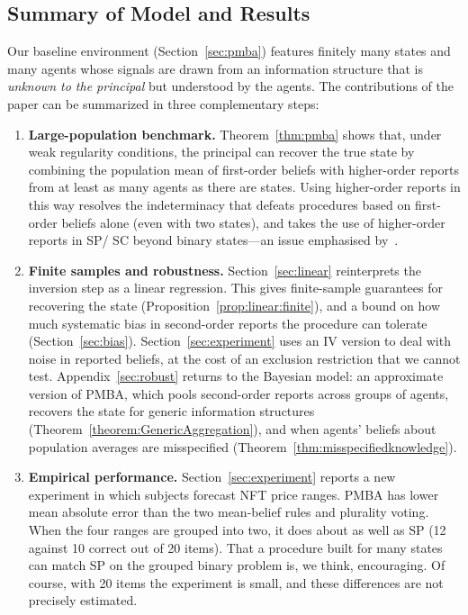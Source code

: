 \documentclass[12pt,reqno]{amsart}
\begin{document}
\subsection{Summary of Model and Results}
Our baseline environment (Section~\ref{sec:pmba}) features finitely many states and many agents whose signals are drawn from an information structure that is \emph{unknown to the principal} but understood by the agents. The contributions of the paper can be summarized in three complementary steps:
\begin{enumerate}
    \item \textbf{Large-population benchmark.} Theorem~\ref{thm:pmba} shows that, under weak regularity conditions, the principal can recover the true state by combining the population mean of first-order beliefs with higher-order reports from at least as many agents as there are states.  Using higher-order reports in this way resolves the indeterminacy that defeats procedures based on first-order beliefs alone (even with two states), and takes the use of higher-order reports in SP/ SC beyond binary states---an issue emphasised by~\cite{prelec2017solution}.
    \item  \textbf{Finite samples and robustness.} Section~\ref{sec:linear} reinterprets the inversion step as a linear regression. This gives finite-sample guarantees for recovering the state (Proposition~\ref{prop:linear:finite}), and a bound on how much systematic bias in second-order reports the procedure can tolerate (Section~\ref{sec:bias}). Section~\ref{sec:experiment} uses an IV version to deal with noise in reported beliefs, at the cost of an exclusion restriction that we cannot test. Appendix~\ref{sec:robust} returns to the Bayesian model: an approximate version of PMBA, which pools second-order reports across groups of agents, recovers the state for generic information structures (Theorem~\ref{theorem:GenericAggregation}), and when agents' beliefs about population averages are misspecified (Theorem~\ref{thm:misspecifiedknowledge}).
    \item \textbf{Empirical performance.}  Section~\ref{sec:experiment} reports a new experiment in which subjects forecast NFT price ranges. PMBA has lower mean absolute error than the two mean-belief rules and plurality voting. When the four ranges are grouped into two, it does about as well as SP (12 against 10 correct out of 20 items). That a procedure built for many states can match SP on the grouped binary problem is, we think, encouraging. Of course, with 20 items the experiment is small, and these differences are not precisely estimated.
\end{enumerate}
\end{document}
